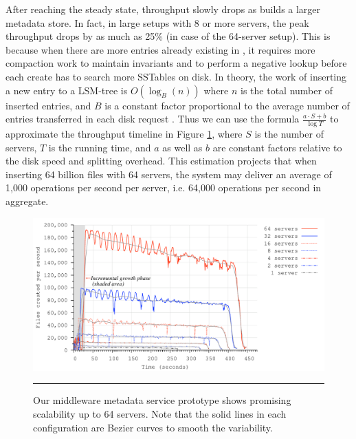After reaching the steady state, throughput slowly drops as \ldb builds a
larger metadata store.
In fact, in large setups with 8 or more servers, 
the peak throughput drops by as much as 25\% (in case of the 64-server setup).
This is because when there are more entries already existing in \ldb, 
it requires more compaction work to maintain \ldb invariants and to perform a 
negative lookup before each create has to search more SSTables on disk. 
In theory, the work of inserting a new entry to a LSM-tree is $O(\log_{B}(n))$
where $n$ is the total number of inserted entries, and $B$ is a constant factor
proportional to the average number of entries transferred in each disk request
\cite{Bender2007}.
Thus we can use the formula $\frac{a\cdot S+b}{\log{T}}$ to
approximate the throughput timeline in Figure \ref{graph:ldb-scaling},
where $S$ is the number of servers, $T$ is the running time, and $a$ as well as $b$ 
are constant factors relative to the disk speed and splitting overhead.
This estimation projects that when inserting 64 billion files with 64 servers,
the system may deliver an average of 1,000 operations per second per server,
i.e. 64,000 operations per second in aggregate.

\begin{figure}[t]  %
\centerline{\includegraphics[scale=0.33]{./figs/ldb_insertrate}}
\caption{\normalsize
Our middleware metadata service prototype shows promising scalability
up to 64 servers. 
Note that the solid lines in each configuration are Bezier
curves to smooth the variability.
}
\vspace{10pt}
\hrule 
\label{graph:ldb-scaling}
\end{figure}       %

